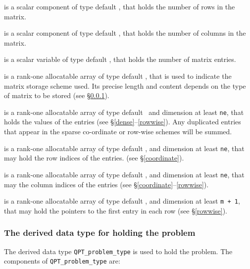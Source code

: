 \documentclass{galahad}
\begin{document}
\begin{description}

 is a scalar component of type default \integer,
that holds the number of rows in the matrix.

 is a scalar component of type default \integer,
that holds the number of columns in the matrix.

 is a scalar variable of type default \integer, that
holds the number of matrix entries.

 is a rank-one allocatable array of type default \character, that
is used to indicate the matrix storage scheme used. Its precise length and
content depends on the type of matrix to be stored (see \S\ref{typeprob}).

 is a rank-one allocatable array of type default \realdp\,
and dimension at least {\tt ne}, that holds the values of the entries
(see \S\ref{dense}--\ref{rowwise}).
Any duplicated entries that appear in the sparse
co-ordinate or row-wise schemes will be summed.

 is a rank-one allocatable array of type default \integer,
and dimension at least {\tt ne}, that may hold the row indices of the entries.
(see \S\ref{coordinate}).

 is a rank-one allocatable array of type default \integer,
and dimension at least {\tt ne}, that may the column indices of the entries
(see \S\ref{coordinate}--\ref{rowwise}).

 is a rank-one allocatable array of type default \integer,
and dimension at least {\tt m + 1}, that may hold the pointers to
the first entry in each row (see \S\ref{rowwise}).

\end{description}


\subsubsection{The derived data type for holding the problem}\label{typeprob}
The derived data type {\tt QPT\_problem\_type} is used to hold
the problem. The components of
{\tt QPT\_problem\_type}
are:
\end{document}
